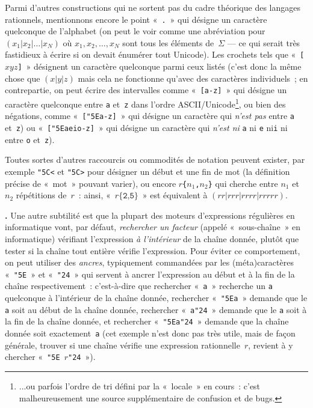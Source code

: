 \documentclass[12pt,a4paper]{article}
\theoremstyle{definition}
\newcommand\thingy{%
\refstepcounter{comcnt}\medskip\noindent\textbf{\thecomcnt.} }
\begin{document}
Parmi d'autres constructions qui ne sortent pas du cadre théorique des
langages rationnels, mentionnons encore le point « \texttt{.} » qui
désigne un caractère quelconque de l'alphabet (on peut le voir comme
une abréviation pour $(x_1|x_2|\ldots|x_N)$ où $x_1,x_2,\ldots,x_N$
sont tous les éléments de $\Sigma$ — ce qui serait très fastidieux à
écrire si on devait énumérer tout Unicode).  Les crochets tels que
« \texttt{[$xyz$]} » désignent un caractère quelconque parmi ceux
listés (c'est donc la même chose que $(x|y|z)$ mais cela ne fonctionne
qu'avec des caractères individuels ; en contrepartie, on peut écrire
des intervalles comme « \texttt{[a-z]} » qui désigne un caractère
quelconque entre \texttt{a} et \texttt{z} dans l'ordre
ASCII/Unicode\footnote{...ou parfois l'ordre de tri défini par la
  « locale » en cours : c'est malheureusement une source supplémentaire de
  confusion et de bugs.}, ou bien des négations, comme
« \texttt{[\char"5Ea-z]} » qui désigne un caractère qui \emph{n'est
  pas} entre \texttt{a} et \texttt{z}) ou
« \texttt{[\char"5Eaeio-z]} » qui désigne un caractère qui \emph{n'est
  ni} \texttt{a} ni \texttt{e} ni\texttt{i} ni entre \texttt{o}
et \texttt{z}).

Toutes sortes d'autres raccourcis ou commodités de notation peuvent
exister, par exemple \texttt{\char"5C<} et \texttt{\char"5C>} pour
désigner un début et une fin de mot (la définition précise de « mot »
pouvant varier), ou encore \texttt{$r$\{$n_1$,$n_2$\}} qui cherche
entre $n_1$ et $n_2$ répétitions de $r$ : ainsi,
« $r\texttt{\{2,5\}}$ » est équivalent à $(rr|rrr|rrrr|rrrrr)$.

\thingy Une autre subtilité est que la plupart des moteurs
d'expressions régulières en informatique vont, par défaut,
\emph{rechercher un facteur} (appelé « sous-chaîne » en informatique)
vérifiant l'expression \emph{à l'intérieur} de la chaîne donnée,
plutôt que tester si la chaîne tout entière vérifie l'expression.
Pour éviter ce comportement, on peut utiliser des \emph{ancres}, typiquement commandées par les
(méta)caractères « \texttt{\char"5E} » et « \texttt{\char"24} » qui
servent à ancrer l'expression au début et à la fin de la chaîne
respectivement : c'est-à-dire que rechercher « \texttt{a} » recherche
un \texttt{a} quelconque à l'intérieur de la chaîne donnée, rechercher
« \texttt{\char"5E\relax a} » demande que le \texttt{a} soit au début
de la chaîne donnée, rechercher « \texttt{a\char"24} » demande que le
\texttt{a} soit à la fin de la chaîne donnée, et rechercher
« \texttt{\char"5E\relax a\char"24} » demande que la chaîne donnée
soit exactement \texttt{a} (cet exemple n'est donc pas très utile,
mais de façon générale, trouver si une chaîne vérifie une expression
rationnelle $r$, revient à y chercher « \texttt{\char"5E\relax
  $r$\char"24} »).
\end{document}
